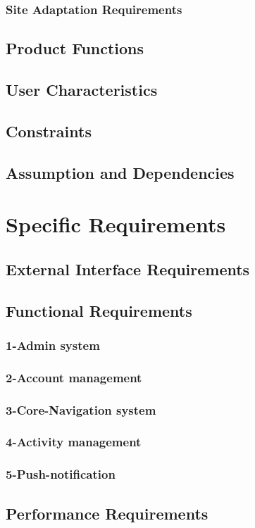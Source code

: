 \documentclass[a4paper,12pt]{article}
\begin{document}
\subsubsection{Site Adaptation Requirements}
\subsection{Product Functions}
\subsection{User Characteristics}
\subsection{Constraints}
\subsection{Assumption and Dependencies}

\section{Specific Requirements}
\subsection{External Interface Requirements}
\subsection{Functional Requirements}
\subsubsection{1-Admin system}
\subsubsection{2-Account management}
\subsubsection{3-Core-Navigation system}
\subsubsection{4-Activity management}
\subsubsection{5-Push-notification}
\subsection{Performance Requirements}
\end{document}
